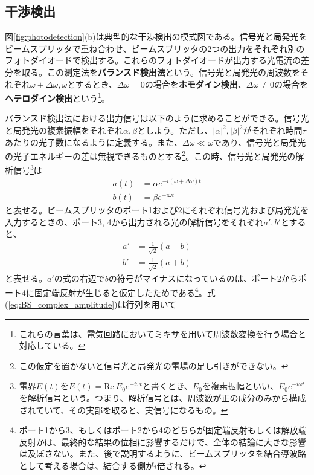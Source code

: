 \subsection{干渉検出}

図\ref{fig:photodetection}(b)は典型的な干渉検出の模式図である。信号光と局発光をビームスプリッタで重ね合わせ、ビームスプリッタの2つの出力をそれぞれ別のフォトダイオードで検出する。これらのフォトダイオードが出力する光電流の差分を取る。この測定法を\textbf{バランスド検出法}という。信号光と局発光の周波数をそれぞれ$\omega + \Delta \omega, \omega$とするとき、$\Delta \omega = 0$の場合を\textbf{ホモダイン検出}、$\Delta \omega \neq 0$の場合を\textbf{ヘテロダイン検出}という\footnote{これらの言葉は、電気回路においてミキサを用いて周波数変換を行う場合と対応している。}。

バランスド検出法における出力信号は以下のように求めることができる。信号光と局発光の複素振幅をそれぞれ$\alpha, \beta$としよう。ただし、$|\alpha|^2, |\beta|^2$がそれぞれ時間$\tau$あたりの光子数になるように定義する。また、$\Delta \omega \ll \omega$であり、信号光と局発光の光子エネルギーの差は無視できるものとする\footnote{この仮定を置かないと信号光と局発光の電場の足し引きができない。}。この時、信号光と局発光の解析信号\footnote{電界$E(t)$を$E(t)=\mathrm{Re} \ E_0 e^{-i\omega t}$と書くとき、$E_0$を複素振幅といい、$E_0 e^{-i\omega t}$を解析信号という。つまり、解析信号とは、周波数が正の成分のみから構成されていて、その実部を取ると、実信号になるもの。}は
\begin{equation}
\begin{aligned}
	a(t) &= \alpha e^{-i(\omega + \Delta \omega)t}\\
  	b(t) &= \beta e^{-i\omega t}
\end{aligned}\label{eq:complex_amplitude}
\end{equation}
と表せる。ビームスプリッタのポート1および2にそれぞれ信号光および局発光を入力するときの、ポート3, 4から出力される光の解析信号をそれぞれ$a', b'$とすると、
\begin{equation}
\begin{aligned}
  a' &= \frac{1}{\sqrt 2}(a - b)\\
  b' &= \frac{1}{\sqrt 2}(a + b)
\end{aligned}\label{eq:BS_complex_amplitude}
\end{equation}
と表せる。$a'$の式の右辺で$b$の符号がマイナスになっているのは、ポート2からポート4に固定端反射が生じると仮定したためである\footnote{ポート1から3、もしくはポート2から4のどちらが固定端反射もしくは解放端反射かは、最終的な結果の位相に影響するだけで、全体の結論に大きな影響は及ぼさない。また、後で説明するように、ビームスプリッタを結合導波路として考える場合は、結合する側が$i$倍される。}。式(\ref{eq:BS_complex_amplitude})は行列を用いて
